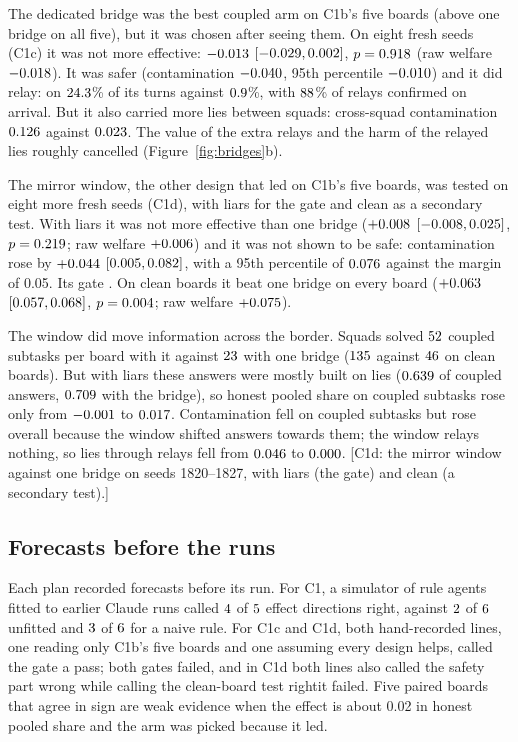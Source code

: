 \documentclass{article}
\newcommand{\pending}[1]{\textcolor{orange!70!black}{[#1]}}
\begin{document}
The dedicated bridge was the best coupled arm on C1b's five boards (above one bridge on all five), but it was chosen after seeing them. On eight fresh seeds (C1c) it was not more effective: $-0.013$ $[-0.029, 0.002]$, $p = 0.918$ (raw welfare $-0.018$). It was safer (contamination $-0.040$, 95th percentile $-0.010$) and it did relay: on $24.3$\% of its turns against $0.9$\%, with $88$\% of relays confirmed on arrival. But it also carried more lies between squads: cross-squad contamination $0.126$ against $0.023$. The value of the extra relays and the harm of the relayed lies roughly cancelled (Figure~\ref{fig:bridges}b).

\ifCOneD
The mirror window, the other design that led on C1b's five boards, was tested on eight more fresh seeds (C1d), with liars for the gate and clean as a secondary test. With liars it was not more effective than one bridge ($+0.008$ $[-0.008, 0.025]$, $p = 0.219$; raw welfare $+0.006$) and it was not shown to be safe: contamination rose by $+0.044$ $[0.005, 0.082]$, with a 95th percentile of $0.076$ against the margin of 0.05. Its gate \GateDVerdict. On clean boards it beat one bridge on every board ($+0.063$ $[0.057, 0.068]$, $p = 0.004$; raw welfare $+0.075$).

The window did move information across the border. Squads solved $52$ coupled subtasks per board with it against $23$ with one bridge ($135$ against $46$ on clean boards). But with liars these answers were mostly built on lies ($0.639$ of coupled answers, $0.709$ with the bridge), so honest pooled share on coupled subtasks rose only from $-0.001$ to $0.017$. Contamination fell on coupled subtasks but rose overall because the window shifted answers towards them; the window relays nothing, so lies through relays fell from $0.046$ to $0.000$.
\else
\pending{C1d: the mirror window against one bridge on seeds 1820--1827, with liars (the gate) and clean (a secondary test).}
\fi

\subsection{Forecasts before the runs}
\label{sec:forecasts}

Each plan recorded forecasts before its run. For C1, a simulator of rule agents fitted to earlier Claude runs called $4$ of $5$ effect directions right, against $2$ of $6$ unfitted and $3$ of $6$ for a naive rule. For C1c\ifCOneD{} and C1d\fi, both hand-recorded lines, one reading only C1b's five boards and one assuming every design helps, called the gate a pass; \ifCOneD both gates failed, and in C1d both lines also called the safety part wrong while calling the clean-board test right\else it failed\fi. Five paired boards that agree in sign are weak evidence when the effect is about 0.02 in honest pooled share and the arm was picked because it led.
\end{document}
